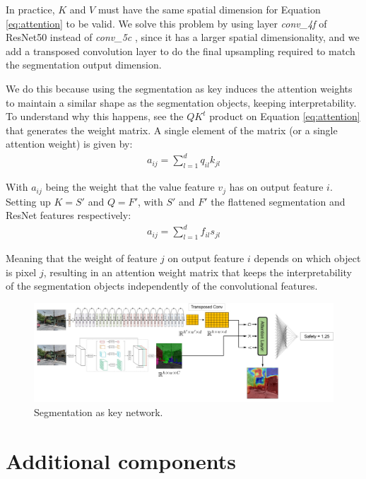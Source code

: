 In practice, $K$ and $V$ must have the same spatial dimension for Equation \ref{eq:attention} to be valid.
We solve this problem by using layer \textit{conv\_4f} of ResNet50 instead of \textit{conv\_5c}  , since it has a
larger spatial dimensionality, and we add a transposed convolution layer \cite{noh_deconv} to do the final upsampling
required to match the segmentation output dimension.

We do this because using the segmentation as key induces the attention weights to maintain a similar shape as the segmentation objects,
keeping interpretability. To understand why this happens, see the $QK^t$ product on Equation \ref{eq:attention} that generates the
weight matrix. A single element of the matrix (or a single attention weight) is given by:
\begin{align}
	a_{ij} = \sum_{l=1}^d q_{il}k_{jl}
\end{align}

With $a_{ij}$ being the weight that the value feature $v_j$ has on output feature $i$. Setting up $K=S'$  and $Q=F'$, with $S'$ and $F'$ the flattened segmentation and ResNet features
respectively:
\begin{align}
	a_{ij} = \sum_{l=1}^d f_{il}s_{jl}
\end{align}

Meaning that the weight of feature $j$ on output feature $i$ depends on which object is pixel $j$, resulting in an attention weight matrix
that keeps the  interpretability of the segmentation objects independently of the convolutional features.

\begin{figure}[ht]
	\begin{center}
	\includegraphics[width=1\textwidth]{./figures/segattn.png}
	\caption[Segmentation as key network]{Segmentation as key network.}
	\label{fig:segrank_1}
	\end{center}
\end{figure}

\section{Additional components}
\label{sec:adds}

